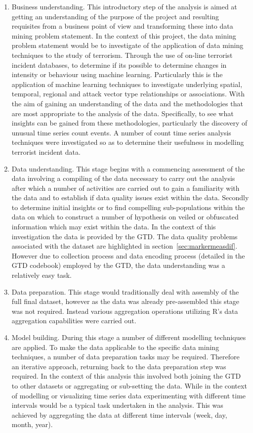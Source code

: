 \begin{enumerate}
\item Business understanding. This introductory step of the analysis is aimed at getting an understanding of the purpose of the project and resulting requisites from a business point of view and transforming these into data mining problem statement. 
In the context of this project, the data mining problem statement would be to investigate of the application of data mining techniques to the study of terrorism. Through the use of on-line terrorist incident  databases, to determine if its possible to determine changes in intensity or behaviour using machine learning. Particularly this is the application of machine learning techniques to investigate underlying spatial, temporal, regional and attack vector type relationships or associations. With the aim of gaining an understanding of the data and the methodologies that are most appropriate to the analysis of the data. Specifically, to see what insights can be gained from these methodologies, particularly the discovery of unusual time series count events. A number of count time series analysis techniques were investigated so as to determine their usefulness in modelling terrorist incident data. 
\item Data understanding. This stage begins with a commencing assessment of the data involving a compiling of the data necessary to carry out the analysis after which a number of activities are carried out to gain a familiarity with the data and to establish if data quality issues exist within the data. Secondly to determine initial insights or to find compelling sub-populations within the data on which to construct a number of hypothesis on veiled or obfuscated information which may exist within the data. In the context of this investigation the data is provided by the GTD. The data quality problems associated with the dataset are highlighted in section~\ref{sec:markermeasdif}. However due to collection process and data encoding process (detailed in the GTD codebook) employed by the GTD, the data understanding was a relatively easy task.
\item Data preparation. This stage would traditionally deal with assembly of the full final dataset, however as the data was already pre-assembled this stage was not required. Instead various aggregation operations utilizing R's data aggregation capabilities were carried out.  
\item Model building. During this stage a number of different modelling techniques are applied. To make the data applicable to the specific data mining techniques, a number of data preparation tasks may be required. Therefore an iterative approach, returning back to the data preparation step was required. In the context of this analysis this involved both joining the GTD to other datasets or aggregating or sub-setting the data. While in the context of modelling or visualizing time series data experimenting with different time intervals would be a typical task undertaken in the analysis. This was achieved by aggregating the data at different time intervals (week, day, month, year).

\end{enumerate}
